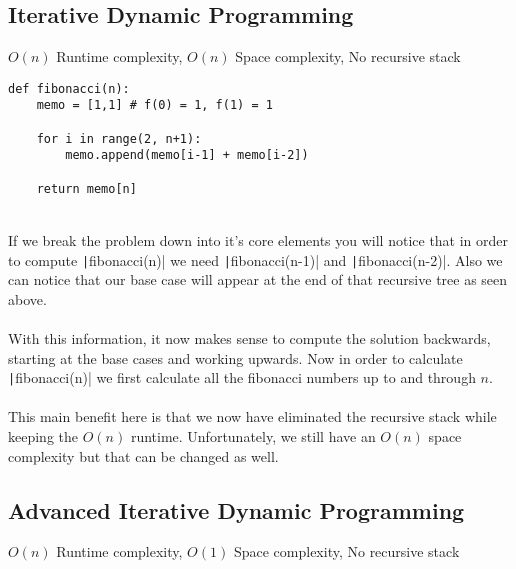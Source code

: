 \documentclass{article}
\newcommand{\inlinecode}[1]{\texttt|#1|}
\begin{document}
		\subsection[IDP]{Iterative Dynamic Programming}
		
			$O(n)$ Runtime complexity, $O(n)$ Space complexity, No recursive stack
			
			\begin{verbatim}
def fibonacci(n):
	memo = [1,1] # f(0) = 1, f(1) = 1
	
	for i in range(2, n+1):
		memo.append(memo[i-1] + memo[i-2])
		
	return memo[n]
			\end{verbatim}
			\\
			If we break the problem down into it's core elements you will notice that in order to compute \inlinecode{fibonacci(n)} we need \inlinecode{fibonacci(n-1)} and \inlinecode{fibonacci(n-2)}. Also we can notice that our base case will appear at the end of that recursive tree as seen above.
			\\
			\\
			With this information, it now makes sense to compute the solution backwards, starting at the base cases and working upwards. Now in order to calculate \inlinecode{fibonacci(n)} we ﬁrst calculate all the ﬁbonacci numbers up to and through $n$.
			\\
			\\
			This main beneﬁt here is that we now have eliminated the recursive stack while keeping the $O(n)$ runtime. Unfortunately, we still have an $O(n)$ space complexity but that can be changed as well.
	
		\subsection[AIDP]{Advanced Iterative Dynamic Programming}
		
			$O(n)$ Runtime complexity, $O(1)$ Space complexity, No recursive stack
			
\end{document}
